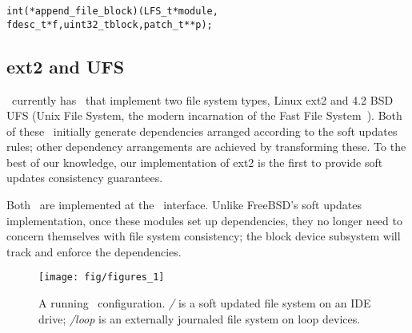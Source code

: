 \vspace{-0.5\baselineskip}
\begin{small}
\begin{alltt}
int (*append_file_block)(LFS_t *module, 
   fdesc_t *f, uint32_t block, patch_t **p);
\end{alltt}
\end{small}
\vspace{-0.5\baselineskip}

\begin{comment}
\noindent
This design lets \LFS\ modules examine and modify the dependency structure.
\end{comment}



\subsection{ext2 and UFS}

\Kudos\ currently has \modules\ that implement two file system types, Linux
ext2 and 4.2 BSD UFS (Unix File System, the modern incarnation of the Fast File
System~\cite{mckusick84fast}).
%
Both of these \modules\ initially generate dependencies arranged according to the
soft updates rules; other dependency arrangements are achieved by transforming these.
To the best of our knowledge, our implementation of ext2 is the first to provide
soft updates consistency guarantees.
%

Both \modules\ are implemented at the \LFS\ interface. 
%
%
%
%
Unlike FreeBSD's soft updates implementation, once these modules set up 
dependencies, they no longer need to concern themselves with file system
consistency; the block device subsystem will track
and enforce the dependencies.


\begin{figure}[t]
  \centering
  \texttt{[image: fig/figures\_1]}
  \caption{A running \Kudos\ configuration. {\it/} is a soft updated
    file system on an IDE drive; {\it/loop} is an externally journaled
    file system on loop devices.}
  \label{fig:kfs-graph}
\end{figure}


